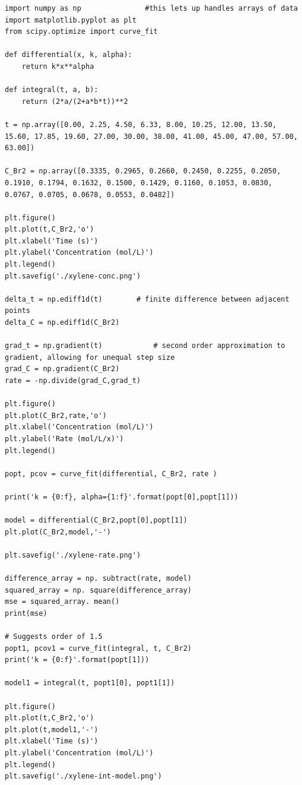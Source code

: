 \documentclass[11pt]{article}
\begin{document}
\begin{verbatim}
import numpy as np               #this lets up handles arrays of data
import matplotlib.pyplot as plt
from scipy.optimize import curve_fit

def differential(x, k, alpha):
    return k*x**alpha

def integral(t, a, b):
    return (2*a/(2+a*b*t))**2

t = np.array([0.00, 2.25, 4.50, 6.33, 8.00, 10.25, 12.00, 13.50, 15.60, 17.85, 19.60, 27.00, 30.00, 38.00, 41.00, 45.00, 47.00, 57.00, 63.00])

C_Br2 = np.array([0.3335, 0.2965, 0.2660, 0.2450, 0.2255, 0.2050, 0.1910, 0.1794, 0.1632, 0.1500, 0.1429, 0.1160, 0.1053, 0.0830, 0.0767, 0.0705, 0.0678, 0.0553, 0.0482])

plt.figure()
plt.plot(t,C_Br2,'o')
plt.xlabel('Time (s)')
plt.ylabel('Concentration (mol/L)')
plt.legend()
plt.savefig('./xylene-conc.png')

delta_t = np.ediff1d(t)        # finite difference between adjacent points
delta_C = np.ediff1d(C_Br2)

grad_t = np.gradient(t)            # second order approximation to gradient, allowing for unequal step size
grad_C = np.gradient(C_Br2)
rate = -np.divide(grad_C,grad_t)

plt.figure()
plt.plot(C_Br2,rate,'o')
plt.xlabel('Concentration (mol/L)')
plt.ylabel('Rate (mol/L/x)')
plt.legend()

popt, pcov = curve_fit(differential, C_Br2, rate )

print('k = {0:f}, alpha={1:f}'.format(popt[0],popt[1]))

model = differential(C_Br2,popt[0],popt[1])
plt.plot(C_Br2,model,'-')

plt.savefig('./xylene-rate.png')

difference_array = np. subtract(rate, model)
squared_array = np. square(difference_array)
mse = squared_array. mean()
print(mse)

# Suggests order of 1.5
popt1, pcov1 = curve_fit(integral, t, C_Br2)
print('k = {0:f}'.format(popt[1]))

model1 = integral(t, popt1[0], popt1[1])

plt.figure()
plt.plot(t,C_Br2,'o')
plt.plot(t,model1,'-')
plt.xlabel('Time (s)')
plt.ylabel('Concentration (mol/L)')
plt.legend()
plt.savefig('./xylene-int-model.png')


\end{verbatim}
\end{document}
